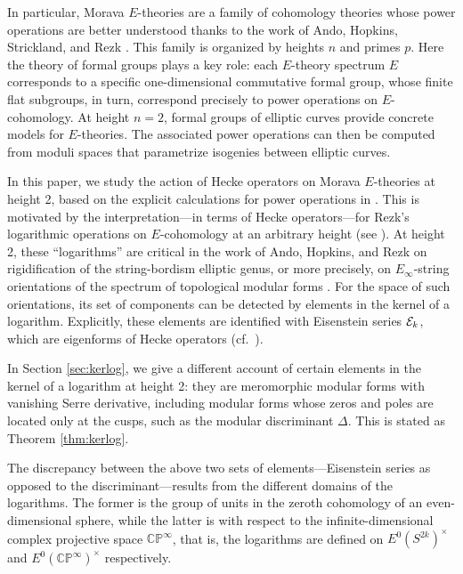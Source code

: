 \documentclass{gtpart}
\theoremstyle{definition}
\theoremstyle{remark}
\newcommand{\mb}[1]{\mathbb{#1}}
\newcommand{\CE}{{\cal E}}
\newcommand{\BC}{{\mb C}}
\newcommand{\BP}{{\mb P}}
\renewcommand{\D}{\Delta}
\renewcommand{\=}{\approx}
\renewcommand{\-}{\sim}
\numberwithin{equation}{section}
\numberwithin{thm}{section}
\begin{document}
In particular, Morava $E$-theories are a family of cohomology theories whose 
power operations are better understood thanks to the work of Ando, Hopkins, 
Strickland, and Rezk \cite{AHS04,cong,h2}.  This family is organized by heights 
$n$ and primes $p$.  Here the theory of formal groups plays a key role: each 
$E$-theory spectrum $E$ corresponds to a specific one-dimensional commutative 
formal group, whose finite flat subgroups, in turn, correspond precisely to 
power operations on $E$-cohomology.  At height $n = 2$, formal groups of 
elliptic curves provide concrete models for $E$-theories.  The associated power 
operations can then be computed from moduli spaces that parametrize isogenies 
between elliptic curves.  

In this paper, we study the action of Hecke operators on Morava $E$-theories at 
height 2, based on the explicit calculations for power operations in 
\cite{h2p2,p3}.  This is motivated by the interpretation---in terms of Hecke 
operators---for Rezk's logarithmic operations on $E$-cohomology at an arbitrary 
height (see \cite[1.12]{log}).  At height 2, these ``logarithms'' are critical 
in the work of Ando, Hopkins, and Rezk on rigidification of the string-bordism 
elliptic genus, or more precisely, on $E_\infty$-string orientations of the 
spectrum of topological modular forms \cite{koandtmf}.  For the space of such 
orientations, its set of components can be detected by elements in the kernel of 
a logarithm.  Explicitly, these elements are identified with Eisenstein series 
$\CE_k$, which are eigenforms of Hecke operators \cite[Theorem 12.3]{koandtmf} 
(cf.~\cite[Theorem 40]{Sprang}).  

In Section \ref{sec:kerlog}, we give a different account of certain elements in 
the kernel of a logarithm at height 2: they are meromorphic modular forms with 
vanishing Serre derivative, including modular forms whose zeros and poles are 
located only at the cusps, such as the modular discriminant $\D$.  This is 
stated as Theorem \ref{thm:kerlog}.  

The discrepancy between the above two sets of elements---Eisenstein series as 
opposed to the discriminant---results from the different domains of the 
logarithms.  The former is the group of units in the zeroth cohomology of an 
even-dimensional sphere, while the latter is with respect to the 
infinite-dimensional complex projective space $\BC\BP^\infty$, that is, the 
logarithms are defined on $E^0(S^{2 k})^\times$ and $E^0(\BC\BP^\infty)^\times$ 
respectively.  
\end{document}
